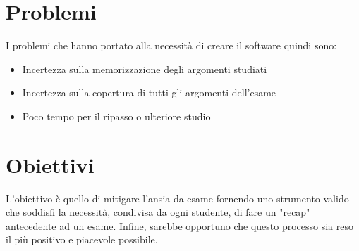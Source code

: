 \section{Problemi}
I problemi che hanno portato alla necessità di creare il software quindi sono: 
    \begin{itemize}
        \item Incertezza sulla memorizzazione degli argomenti studiati 
        \item Incertezza sulla copertura di tutti gli argomenti dell'esame
        \item Poco tempo per il ripasso o ulteriore studio
    \end{itemize}
 

\section{Obiettivi}
L'obiettivo è quello di mitigare l'ansia da esame fornendo uno strumento valido che soddisfi la necessità, condivisa da ogni studente, di fare un "recap" antecedente ad un esame.
Infine, sarebbe opportuno che questo processo sia reso il più positivo e piacevole possibile.

